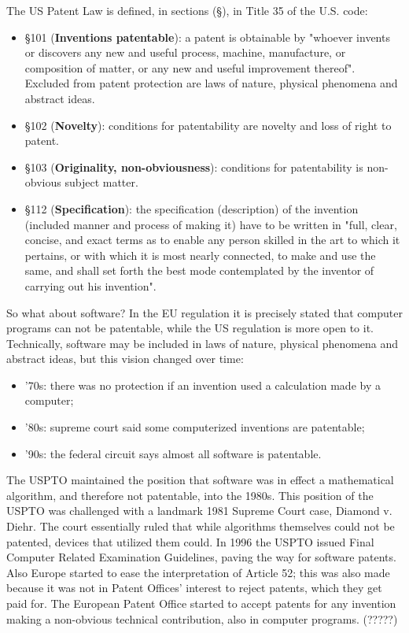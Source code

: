 \documentclass[a4paper, 10pt, titlepage]{article}
\begin{document}
The US Patent Law is defined, in sections (\S), in Title 35 of the U.S. code:
\begin{itemize}
\item \S 101 (\textbf{Inventions patentable}): a patent is obtainable by "whoever invents or discovers any new and useful process, machine, manufacture, or composition of matter, or any new and useful improvement thereof". Excluded from patent protection are laws of nature, physical phenomena and abstract ideas.
\item \S 102 (\textbf{Novelty}): conditions for patentability are  novelty and loss of right to patent.
\item \S 103 (\textbf{Originality, non-obviousness}): conditions for patentability is non-obvious subject matter.
\item \S 112 (\textbf{Specification}): the specification (description) of the invention (included manner and process of making it) have to be written in "full, clear, concise, and exact terms as to enable any person skilled in the art to which it pertains, or with which it is most nearly connected, to make and use the same, and shall set forth the best mode contemplated by the inventor of carrying out his invention".
\end{itemize}
So what about software? In the EU regulation it is precisely stated that computer programs can not be patentable, while the US regulation is more open to it. Technically, software may be included in laws of nature, physical phenomena and abstract ideas, but this vision changed over time:
\begin{itemize}
\item '70s: there was no protection if an invention used a calculation made by a computer;
\item '80s: supreme court said some computerized inventions are patentable;
\item '90s: the federal circuit says almost all software is patentable.
\end{itemize}
The USPTO maintained the position that software was in effect a mathematical algorithm, and therefore not patentable, into the 1980s. This position of the USPTO was challenged with a landmark 1981 Supreme Court case, Diamond v. Diehr. The court essentially ruled that while algorithms themselves could not be patented, devices that utilized them could. In 1996 the USPTO issued Final Computer Related Examination Guidelines, paving the way for software patents. \\
Also Europe started to ease the interpretation of Article 52; this was also made because it was not in Patent Offices' interest to reject patents, which they get paid for. The European Patent Office started to accept patents for any invention making a non-obvious technical contribution, also in computer programs. (?????)
\end{document}
